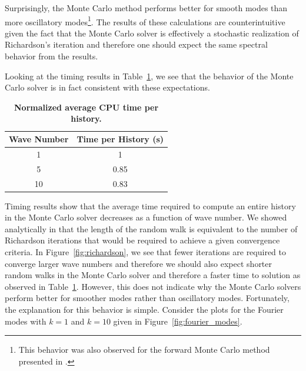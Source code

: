\documentclass[note]{TechNote}
\begin{document}
Surprisingly, the Monte Carlo method performs better for smooth modes
than more oscillatory modes\footnote{This behavior was also observed
  for the forward Monte Carlo method presented in
  \cite{evans_monte_2012}.}. The results of these calculations are
counterintuitive given the fact that the Monte Carlo solver is
effectively a stochastic realization of Richardson's iteration and
therefore one should expect the same spectral behavior from the
results.

Looking at the timing results in Table~\ref{tab:mc_timing}, we see
that the behavior of the Monte Carlo solver is in fact consistent with
these expectations.
\begin{table}[h!]
  \begin{center}
    \begin{tabular}{cc}\hline\hline
      \multicolumn{1}{c}{\textbf{Wave Number}} & 
      \multicolumn{1}{c}{\textbf{Time per History (s)}} \\
      \hline
      1 & 1 \\
      5 & 0.85 \\
      10 & 0.83 \\
      \hline\hline
    \end{tabular}
  \end{center}
  \caption{\textbf{Normalized average CPU time per history.}}
  \label{tab:mc_timing}
\end{table}
Timing results show that the average time required to compute an
entire history in the Monte Carlo solver decreases as a function of
wave number. We showed analytically in \cite{slattery_2013} that the
length of the random walk is equivalent to the number of Richardson
iterations that would be required to achieve a given convergence
criteria. In Figure~\ref{fig:richardson}, we see that fewer iterations
are required to converge larger wave numbers and therefore we should
also expect shorter random walks in the Monte Carlo solver and
therefore a faster time to solution as observed in
Table~\ref{tab:mc_timing}. However, this does not indicate why the
Monte Carlo solvers perform better for smoother modes rather than
oscillatory modes. Fortunately, the explanation for this behavior is
simple. Consider the plots for the Fourier modes with $k = 1$ and $k =
10$ given in Figure~\ref{fig:fourier_modes}.
\end{document}
